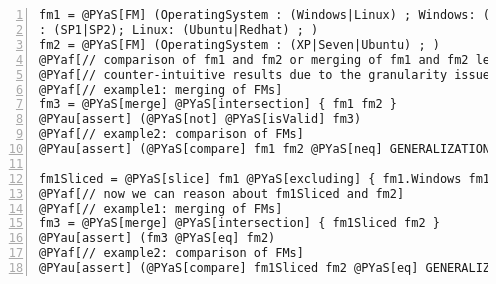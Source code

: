 \documentclass{article}
\begin{document}
\section*{}

\begin{Verbatim}[commandchars=@\[\],numbers=left,firstnumber=1,stepnumber=1]
fm1 = @PYaS[FM] (OperatingSystem : (Windows|Linux) ; Windows: (XP|Seven); XP
: (SP1|SP2); Linux: (Ubuntu|Redhat) ; )
fm2 = @PYaS[FM] (OperatingSystem : (XP|Seven|Ubuntu) ; )
@PYaf[// comparison of fm1 and fm2 or merging of fm1 and fm2 lead to ]
@PYaf[// counter-intuitive results due to the granularity issue.]
@PYaf[// example1: merging of FMs]
fm3 = @PYaS[merge] @PYaS[intersection] { fm1 fm2 }
@PYau[assert] (@PYaS[not] @PYaS[isValid] fm3)
@PYaf[// example2: comparison of FMs]
@PYau[assert] (@PYaS[compare] fm1 fm2 @PYaS[neq] GENERALIZATION)

fm1Sliced = @PYaS[slice] fm1 @PYaS[excluding] { fm1.Windows fm1.Linux fm1.SP1 fm1.SP2 }
@PYaf[// now we can reason about fm1Sliced and fm2]
@PYaf[// example1: merging of FMs]
fm3 = @PYaS[merge] @PYaS[intersection] { fm1Sliced fm2 }
@PYau[assert] (fm3 @PYaS[eq] fm2)
@PYaf[// example2: comparison of FMs]
@PYau[assert] (@PYaS[compare] fm1Sliced fm2 @PYaS[eq] GENERALIZATION)
\end{Verbatim}
\end{document}

